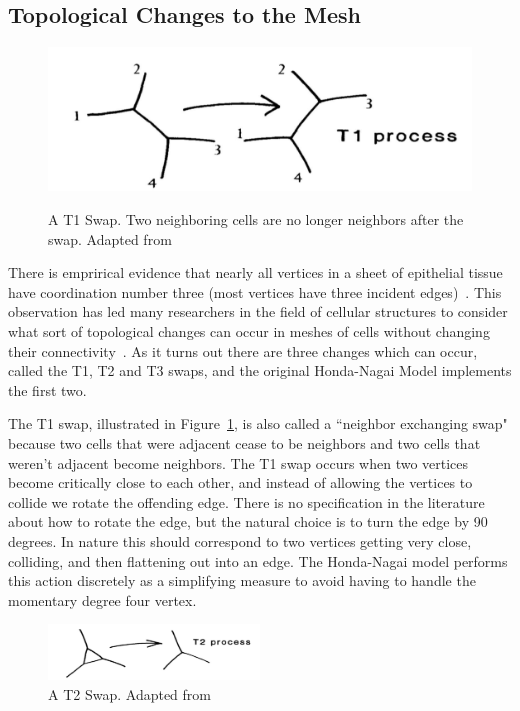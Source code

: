 \subsection{Topological Changes to the Mesh}
\begin{figure}
    \centering
    \includegraphics[width=\textwidth, keepaspectratio]{../diagrams/t1.png}
    \label{fig:t1}
    \caption[A T1 Swap]{A T1 Swap. Two neighboring cells are no longer neighbors after the swap. Adapted from~\cite{Soap}}
\end{figure}
There is emprirical evidence that nearly all vertices in a sheet of epithelial tissue have coordination number three (most vertices have three incident edges)~\cite{EpithelialTopology}. This observation has led many researchers in the field of cellular structures to consider what sort of topological changes can occur in meshes of cells without changing their connectivity~\cite{Soap}.  As it turns out there are three changes which can occur, called the T1, T2 and T3 swaps, and the original Honda-Nagai Model implements the first two.

 The T1 swap, illustrated in Figure~\ref{fig:t1}, is also called a ``neighbor exchanging swap" because two cells that were adjacent cease to be neighbors and two cells that weren't adjacent become neighbors. The T1 swap occurs when two vertices become critically close to each other, and instead of allowing the vertices to collide we rotate the offending edge. There is no specification in the literature about how to rotate the edge, but the natural choice is to turn the edge by 90 degrees. In nature this should correspond to two vertices getting very close, colliding, and then flattening out into an edge. The Honda-Nagai model performs this action discretely as a simplifying measure to avoid having to handle the momentary degree four vertex.


\begin{figure}
\centering
\includegraphics[width=0.5\textwidth]{../diagrams/t2.png}
\caption[A T2 Swap]{A T2 Swap. Adapted from~\cite{Soap}}
\label{fig:t2}
\end{figure}


